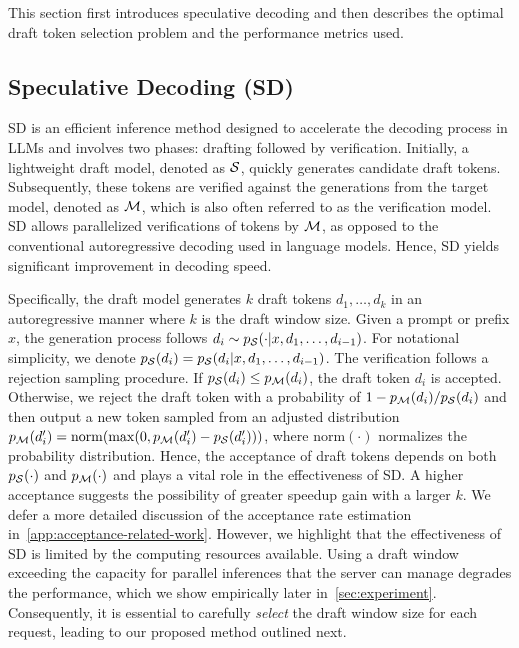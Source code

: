 

This section first introduces speculative decoding and then describes the optimal draft token selection problem and the performance metrics used.

\subsection{Speculative Decoding (SD)}
SD is an efficient inference method designed to accelerate the decoding process in LLMs and 
involves two phases: drafting followed by verification.
Initially, a lightweight draft model, denoted as ${\mathcal{S}}$, quickly generates candidate draft tokens.
Subsequently, these tokens are verified against the generations from the target model, denoted as ${\mathcal{M}}$, which is also often referred to as the verification model.
SD allows parallelized verifications of tokens by ${\mathcal{M}}$, as opposed to the conventional autoregressive decoding used in language models.
Hence, SD yields significant improvement in decoding speed.

Specifically, the draft model generates $k$ draft tokens $d_1, \ldots, d_k$ in an autoregressive manner  where $k$ is the draft window size.
Given a prompt or prefix $x$, the generation process follows $d_i \sim p_{\mathcal{S}}(\cdot|x, d_1, \ldots, d_{i-1})$.
For notational simplicity, we denote $p_{\mathcal{S}}(d_i) = p_{\mathcal{S}}(d_i|x, d_1, \ldots, d_{i-1})$.
The verification follows a rejection sampling procedure.
If $p_{\mathcal{S}}(d_i) \leq p_{\mathcal{M}}(d_i)$, the draft token $d_i$ is accepted.
Otherwise, we reject the draft token with a probability of $1 - p_{\mathcal{M}}(d_i)/p_{\mathcal{S}}(d_i)$ and then output a new token sampled from an adjusted distribution $p_{\mathcal{M}}(d_i') = \mathrm{norm}(\max(0, p_{\mathcal{M}}(d_i') - p_{\mathcal{S}}(d_i')))$, where $\mathrm{norm}(\cdot)$ normalizes the probability distribution.
Hence, the acceptance of draft tokens depends on both $p_{\mathcal{S}}(\cdot)$ and $p_{\mathcal{M}}(\cdot)$ and plays a vital role in the effectiveness of SD.
A higher acceptance suggests the possibility of greater speedup gain with a larger $k$.
We defer a more detailed discussion of the acceptance rate estimation in~\cref{app:acceptance-related-work}. 
However, we highlight that the effectiveness of SD is limited by the computing resources available. 
Using a draft window exceeding the capacity for parallel inferences that the server can manage degrades the performance, which we show empirically later in~\cref{sec:experiment}. 
Consequently, it is essential to carefully \textit{select} the draft window size for each request, leading to our proposed method outlined next.

